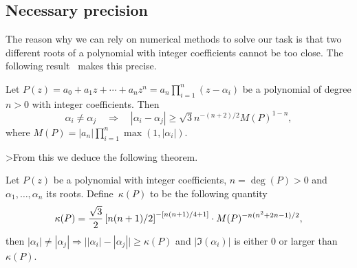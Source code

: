 \subsection{Necessary precision}
The reason why we can rely on numerical methods to solve our task is that
two different roots of a polynomial with integer coefficients cannot
be too close. The
following result~\cite{Mahler64} makes this precise.
\begin{proposition}[Mahler]
Let $P(z)=a_0+a_1 z+\cdots +a_n z^n =a_n \prod_{i=1}^n (z-\alpha_i)$
be a polynomial of degree $n>0$ with integer coefficients. 
Then 
$$\alpha_i \not = \alpha_j\quad\Longrightarrow\quad|\alpha_i-\alpha_j| \geq \sqrt{3} n^{-(n+2)/2}
M(P)^{1-n},$$
where $M(P)=|a_n| \prod_{i=1}^n \max(1,|\alpha_i|)$.
\end{proposition}
>From this we deduce the following theorem.
\begin{th}\label{th1}
Let $P(z)$ be a polynomial with integer coefficients, $n=\deg(P)>0$ and
$\alpha_1,\ldots,\alpha_n$  its roots. Define~$\kappa(P)$ to be
the following quantity
\begin{equation} \label{kappa}
\kappa(P)= { \sqrt{3} \over 2} \left[ n(n+1)/2 \right]^{- [ n(n+1)/4
+1 ]} \cdot M(P)^{-n(n^2+2n-1)/2},
\end{equation}
then
$|\alpha_i| \not= |\alpha_j|\Longrightarrow\bigl|
|\alpha_i|-|\alpha_j| \bigr| \geq \kappa(P)$ and
$|\Im(\alpha_i)|$ is either 0 or larger than $\kappa(P)$.
\end{th}
